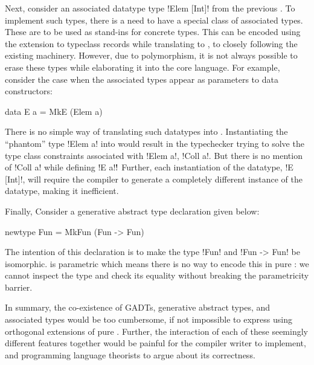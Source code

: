 \documentclass[screen,nonacm]{acmart}
\begin{document}
Next, consider an associated datatype type !Elem [Int]! from the
previous . To implement such types, there is a
need to have a special class of associated types. These are to be used
as stand-ins for concrete types. This can be encoded
using the extension to typeclass records while translating to \SF,
to closely following the existing machinery. However, due to
polymorphism, it is not always possible to erase these types while
elaborating it into the core language. For example,
consider the case when the associated types appear as parameters to
data constructors:

\begin{CenteredBox}
\begin{code}
data E a = MkE (Elem a)
\end{code}
\end{CenteredBox}

There is no simple way of translating such datatypes into \SF.
Instantiating the ``phantom'' type !Elem a! into \SF would result in
the typechecker trying to solve the type class constraints associated
with !Elem a!, !Coll a!. But there is no mention of !Coll a! while
defining !E a!$!$ Further, each instantiation of the
datatype, !E [Int]!, will require the compiler to generate a
completely different instance of the datatype, making it
inefficient.

Finally, Consider a generative abstract type declaration given below:

\begin{CenteredBox}
\begin{code}
newtype Fun = MkFun (Fun -> Fun)
\end{code}
\end{CenteredBox}
The intention of this declaration is to make the type !Fun!
and !Fun -> Fun! be isomorphic. \SF is parametric which means
there is no way to encode this in pure \SF: we cannot inspect the type
and check its equality without breaking the parametricity barrier.

In summary, the co-existence of GADTs, generative abstract
types, and associated types would be too cumbersome, if not impossible
to express using orthogonal extensions of pure \SF. Further, the
interaction of each of these seemingly different features together would
be painful for the compiler writer to implement, and programming
language theorists to argue about its correctness.
\end{document}
